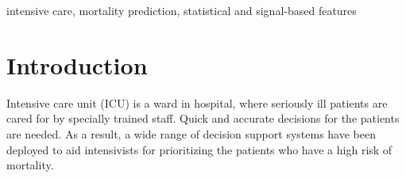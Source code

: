 \documentclass[3p]{elsarticle}
\begin{document}
\begin{frontmatter}
\begin{abstract}
\end{abstract}

\begin{keyword}
intensive care, mortality prediction, statistical and signal-based features
\end{keyword}

\end{frontmatter}

\section{Introduction}
  \label{sec:intro}

Intensive care unit (ICU) is a ward in hospital, where seriously ill patients are cared for by specially trained staff.  Quick and accurate decisions for the patients are needed. As a result, a wide range of decision support systems have been deployed to aid intensivists for prioritizing the patients who have a high risk of mortality.
\end{document}
